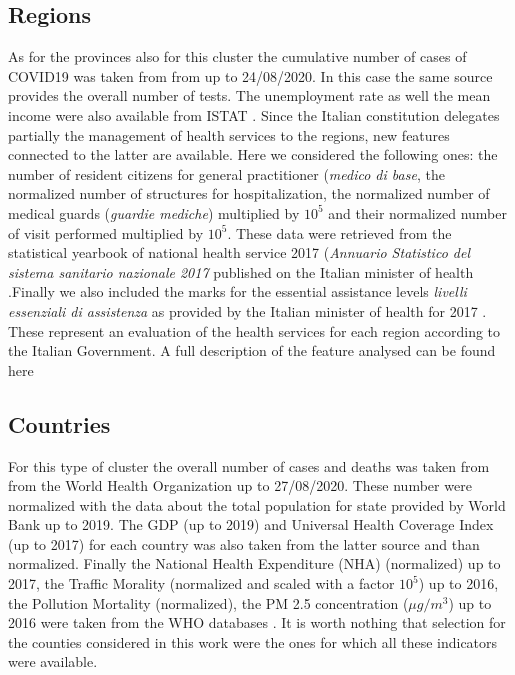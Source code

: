 \documentclass[
12pt, %
a4paper, %
oneside, %
headinclude,footinclude, %
BCOR5mm, %
]{scrartcl}
\begin{document}
\subsection{Regions}
As for the provinces also for this cluster the cumulative number of cases of COVID19 was taken from from \cite{github-protezionecivile} up to 24/08/2020. In this case the same source provides the overall number of tests. The unemployment rate as well the mean income were also available from ISTAT \cite{ISTAT}. Since the Italian constitution delegates partially the management of health services to the regions, new features connected to the latter are available. Here we considered the following ones: the number of resident citizens for general practitioner (\textit{medico di base}, the normalized number of structures for hospitalization, the normalized number of medical guards (\textit{guardie mediche}) multiplied by $10^{5}$ and their normalized number of visit performed multiplied by $10^{5}$. These data were retrieved from the statistical yearbook of national health service 2017 (\textit{Annuario Statistico del sistema sanitario nazionale 2017} published on the Italian minister of health \cite{AnnuarioSSN2017}.Finally we also included the marks for the essential assistance levels \textit{livelli essenziali di assistenza} as provided by the Italian minister of health for 2017 \cite{LeaRank} . These represent an evaluation of the health services for each region according to the Italian Government. A full description of the feature analysed can be found here \cite{LeaDesc}

\subsection{Countries}

For this type of cluster the overall number of cases and deaths was taken from from the World Health Organization \cite{whoCases} up to 27/08/2020. These number were normalized with the data about the total population for state provided by World Bank \cite{worldBank} up to 2019. The GDP (up to 2019) and Universal Health Coverage Index \cite{whoUHC} (up to 2017) for each country was also taken from the latter source \cite{worldBank} and than normalized. Finally the National Health Expenditure (NHA) (normalized) up to 2017, the Traffic Morality (normalized and scaled with a factor $10^{5}$) up to 2016, the Pollution Mortality (normalized), the PM 2.5 concentration ($\mu g/m^{3}$) up to 2016 were taken from the WHO databases \cite{whoDb}. It is worth nothing that selection for the counties considered in this work were the ones for which all these indicators were available. 
\end{document}
